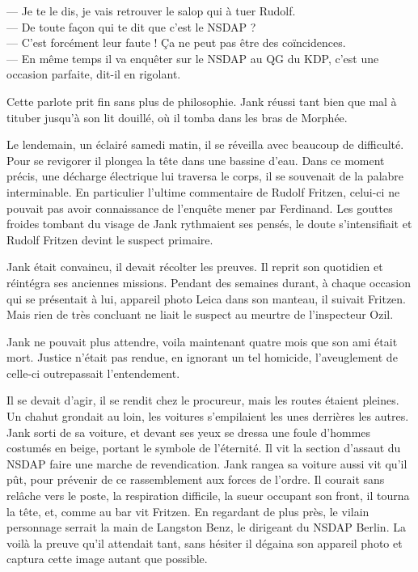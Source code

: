 --- Je te le dis, je vais retrouver le salop qui à tuer Rudolf.\\
--- De toute façon qui te dit que c'est le NSDAP ?\\
--- C'est forcément leur faute ! Ça ne peut pas être des coïncidences.\\
--- En même temps il va enquêter sur le NSDAP au QG du KDP, c'est une occasion parfaite, dit-il en rigolant.

Cette parlote prit fin sans plus de philosophie.
Jank réussi tant bien que mal à tituber jusqu'à son lit douillé, où il tomba dans les bras de Morphée.

Le lendemain, un éclairé samedi matin, il se réveilla avec beaucoup de difficulté.
Pour se revigorer il plongea la tête dans une bassine d'eau. 
Dans ce moment précis, une décharge électrique lui traversa le corps, il se souvenait de la palabre interminable.
En particulier l'ultime commentaire de Rudolf Fritzen, celui-ci ne pouvait pas avoir connaissance de l'enquête mener par Ferdinand.
Les gouttes froides tombant du visage de Jank rythmaient ses pensés, le doute s'intensifiait et Rudolf Fritzen devint le suspect primaire.

Jank était convaincu, il devait récolter les preuves. 
Il reprit son quotidien et réintégra ses anciennes missions.
Pendant des semaines durant, à chaque occasion qui se présentait à lui, appareil photo Leica dans son manteau, il suivait Fritzen.
Mais rien de très concluant ne liait le suspect au meurtre de l'inspecteur Ozil.

Jank ne pouvait plus attendre, voila maintenant quatre mois que son ami était mort.
Justice n'était pas rendue, en ignorant un tel homicide, l'aveuglement de celle-ci outrepassait l'entendement.

Il se devait d'agir, il se rendit chez le procureur, mais les routes étaient pleines.
Un chahut grondait au loin, les voitures s'empilaient les unes derrières les autres.
Jank sorti de sa voiture, et devant ses yeux se dressa une foule d'hommes costumés en beige, portant le symbole de l'éternité.
Il vit la section d'assaut du NSDAP faire une marche de revendication.
Jank rangea sa voiture aussi vit qu'il pût, pour prévenir de ce rassemblement aux forces de l'ordre.
Il courait sans relâche vers le poste, la respiration difficile, la sueur occupant son front, il tourna la tête, et, comme au bar vit Fritzen.
En regardant de plus près, le vilain personnage serrait la main de Langston Benz, le dirigeant du NSDAP Berlin.
La voilà la preuve qu'il attendait tant, sans hésiter il dégaina son appareil photo et captura cette image autant que possible.

